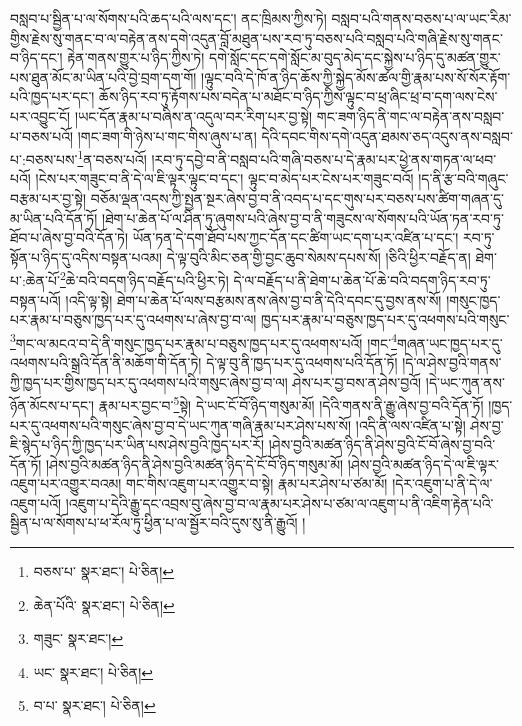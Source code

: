 བསླབ་པ་སྦྱིན་པ་ལ་སོགས་པའི་ཆད་པའི་ལས་དང་། ནང་ཁྲིམས་ཀྱིས་ཏེ། བསླབ་པའི་གནས་བཅས་པ་ལ་ཡང་རིམ་གྱིས་རྗེས་སུ་གནང་བ་ལ་བརྟེན་ནས་དགེ་འདུན་བློ་མཐུན་པས་རབ་ཏུ་བཅས་པའི་བསླབ་པའི་གཞི་རྗེས་སུ་གནང་བ་ཉིད་དང་། རྟེན་གནས་གྱུར་པ་ཉིད་ཀྱིས་ཏེ། དགེ་སློང་དང་དགེ་སློང་མ་བུད་མེད་དང་སྐྱེས་པ་ཉིད་དུ་མཚན་གྱུར་པས་ཐུན་མོང་མ་ཡིན་པའི་བྱེ་བྲག་དག་གོ། །ལྟུང་བའི་དེ་ཁོ་ན་ཉིད་ཆོས་ཀྱི་སྐྱེད་མོས་ཚལ་གྱི་རྣམ་པས་སོ་སོར་རྟོག་པའི་ཁྱད་པར་དང་། ཆོས་ཉིད་རབ་ཏུ་རྟོགས་པས་བདེན་པ་མཐོང་བ་ཉིད་ཀྱིས་ལྟུང་བ་ཕྲ་ཞིང་ཕྲ་བ་དག་ལས་ངེས་པར་འབྱུང་ངོ། །ཡང་དོན་རྣམ་པ་བཞིས་ན་འདུལ་བར་རིག་པར་བྱ་སྟེ། གང་ཟག་ཉིད་ནི་གང་ལ་བརྟེན་ནས་བསླབ་པ་བཅས་པའོ། །གང་ཟག་གི་ཉེས་པ་གང་གིས་ཞུས་པ་ན། དེའི་དབང་གིས་དགེ་འདུན་ཐམས་ཅད་འདུས་ནས་བསླབ་པ་:བཅས་པས་\footnote{བཅས་པ་  སྣར་ཐང་།  པེ་ཅིན། }ན་བཅས་པའོ། །རབ་ཏུ་དབྱེ་བ་ནི་བསླབ་པའི་གཞི་བཅས་པ་དེ་རྣམ་པར་ཕྱེ་ནས་གཏན་ལ་ཕབ་པའོ། །ངེས་པར་གཟུང་བ་ནི་དེ་ལ་ཇི་ལྟར་ལྟུང་བ་དང་། ལྟུང་བ་མེད་པར་ངེས་པར་གཟུང་བའོ། །ད་ནི་རྩ་བའི་གཞུང་བརྩམ་པར་བྱ་སྟེ། བཅོམ་ལྡན་འདས་ཀྱི་སྤྱན་སྔར་ཞེས་བྱ་བ་ནི་འབད་པ་དང་གུས་པར་བཅས་པས་ཚིག་གཞན་དུ་མ་ཡིན་པའི་དོན་ཏོ། །ཐེག་པ་ཆེན་པོ་ལ་ཤིན་ཏུ་ཞུགས་པའི་ཞེས་བྱ་བ་ནི་གཟུངས་ལ་སོགས་པའི་ཡོན་ཏན་རབ་ཏུ་ཐོབ་པ་ཞེས་བྱ་བའི་དོན་ཏེ། ཡོན་ཏན་དེ་དག་ཐོབ་པས་ཀྱང་དོན་དང་ཚིག་ཡང་དག་པར་འཛིན་པ་དང་། རབ་ཏུ་སྟོན་པ་ཉིད་དུ་འདིས་བསྟན་པའམ། དེ་ལྟ་བུའི་མིང་ཅན་གྱི་བྱང་ཆུབ་སེམས་དཔས་སོ། །ཅིའི་ཕྱིར་བརྗོད་ན། ཐེག་པ་:ཆེན་པོ་\footnote{ཆེན་པོའི་  སྣར་ཐང་།  པེ་ཅིན། }ཆེ་བའི་བདག་ཉིད་བརྗོད་པའི་ཕྱིར་ཏེ། དེ་ལ་བརྗོད་པ་ནི་ཐེག་པ་ཆེན་པོ་ཆེ་བའི་བདག་ཉིད་རབ་ཏུ་བསྟན་པའོ། །འདི་ལྟ་སྟེ། ཐེག་པ་ཆེན་པོ་ལས་བརྩམས་ནས་ཞེས་བྱ་བ་ནི་དེའི་དབང་དུ་བྱས་ནས་སོ། །གསུང་ཁྱད་པར་རྣམ་པ་བཅུས་ཁྱད་པར་དུ་འཕགས་པ་ཞེས་བྱ་བ་ལ། ཁྱད་པར་རྣམ་པ་བཅུས་ཁྱད་པར་དུ་འཕགས་པའི་གསུང་\footnote{གཟུང་  སྣར་ཐང་། }གང་ལ་མངའ་བ་དེ་ནི་གསུང་ཁྱད་པར་རྣམ་པ་བཅུས་ཁྱད་པར་དུ་འཕགས་པའོ། །གང་\footnote{ཡང་  སྣར་ཐང་།  པེ་ཅིན། }གཞན་ཡང་ཁྱད་པར་དུ་འཕགས་པའི་སྒྲའི་དོན་ནི་མཆོག་གི་དོན་ཏེ། དེ་ལྟ་བུ་ནི་ཁྱད་པར་དུ་འཕགས་པའི་དོན་ཏོ། །དེ་ལ་ཤེས་བྱའི་གནས་ཀྱི་ཁྱད་པར་གྱིས་ཁྱད་པར་དུ་འཕགས་པའི་གསུང་ཞེས་བྱ་བ་ལ། ཤེས་པར་བྱ་བས་ན་ཤེས་བྱའོ། །དེ་ཡང་ཀུན་ནས་ཉོན་མོངས་པ་དང་། རྣམ་པར་བྱང་བ་\footnote{བ་པ་  སྣར་ཐང་།  པེ་ཅིན། }སྟེ། དེ་ཡང་ངོ་བོ་ཉིད་གསུམ་མོ། །དེའི་གནས་ནི་རྒྱུ་ཞེས་བྱ་བའི་དོན་ཏོ། །ཁྱད་པར་དུ་འཕགས་པའི་གསུང་ཞེས་བྱ་བ་དེ་ཡང་ཀུན་གཞི་རྣམ་པར་ཤེས་པས་སོ། །འདི་ནི་ལས་འཛིན་པ་སྟེ། ཤེས་བྱ་ཇི་སྙེད་པ་ཉིད་ཀྱི་ཁྱད་པར་ཡིན་པས་ཤེས་བྱའི་ཁྱད་པར་རོ། །ཤེས་བྱའི་མཚན་ཉིད་ནི་ཤེས་བྱའི་ངོ་བོ་ཞེས་བྱ་བའི་དོན་ཏོ། །ཤེས་བྱའི་མཚན་ཉིད་ནི་ཤེས་བྱའི་མཚན་ཉིད་དེ་ངོ་བོ་ཉིད་གསུམ་མོ། །ཤེས་བྱའི་མཚན་ཉིད་དེ་ལ་ཇི་ལྟར་འཇུག་པར་འགྱུར་བའམ། གང་གིས་འཇུག་པར་འགྱུར་བ་སྟེ། རྣམ་པར་ཤེས་པ་ཙམ་མོ། །དེར་འཇུག་པ་ནི་དེ་ལ་འཇུག་པའོ། །འཇུག་པ་དེའི་རྒྱུ་དང་འབྲས་བུ་ཞེས་བྱ་བ་ལ་རྣམ་པར་ཤེས་པ་ཙམ་ལ་འཇུག་པ་ནི་འཇིག་རྟེན་པའི་སྦྱིན་པ་ལ་སོགས་པ་ཕ་རོལ་ཏུ་ཕྱིན་པ་ལ་སྦྱོར་བའི་དུས་སུ་ནི་རྒྱུའོ། །
